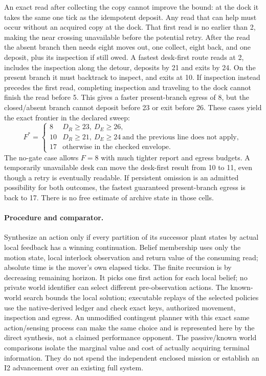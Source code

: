 \documentclass{article}
\begin{document}
An exact read after collecting the copy cannot improve the bound:
at the dock it takes the same one tick as the idempotent deposit.
Any read that can help must occur without an acquired copy at the
dock. That first read is no earlier than 2, making the near crossing
unavailable before the potential retry. After the read the absent
branch then needs eight moves out, one collect, eight back, and one
deposit, plus its inspection if still owed. A fastest desk-first
route reads at 2, includes the inspection along the detour, deposits
by 21 and exits by 24. On the present branch it must backtrack to
inspect, and exits at 10. If inspection instead precedes the first
read, completing inspection and traveling to the dock cannot finish
the read before 5. This gives a faster present-branch egress of 8,
but the closed/absent branch cannot deposit before 23 or exit before
26. These cases yield the exact frontier in the declared sweep:
\[
F^*=\begin{cases}
8 & D_R\ge 23,\ D_E\ge 26,\\
10 & D_R\ge 21,\ D_E\ge 24\ \text{and the previous line does not apply},\\
17 & \text{otherwise in the checked envelope.}
\end{cases}
\]
The no-gate case allows $F=8$ with much tighter report and egress
budgets. A temporarily unavailable desk can move the desk-first result
from 10 to 11, even though a retry is eventually readable. If
persistent omission is an admitted possibility for both outcomes,
the fastest guaranteed present-branch egress is back to 17. There
is no free estimate of archive state in those cells.

\paragraph{Procedure and comparator.}
Synthesize an action only if every partition of its successor plant
states by actual local feedback has a winning continuation. Belief
membership uses only the motion state, local interlock observation and
return value of the consuming read; absolute time is the mover's
own elapsed ticks. The finite recursion is by decreasing remaining
horizon. It picks one first action for each local belief; no private
world identifier can select different pre-observation actions. The
known-world search bounds the local solution; executable replays of
the selected policies use the native-derived ledger and check exact
keys, authorized movement, inspection and egress. An unmodified
contingent planner with this exact same action/sensing process can
make the same choice and is represented here by the direct
synthesis, not a claimed performance opponent. The passive/known
world comparisons isolate the marginal value and cost of actually
acquiring terminal information. They do not spend the independent
enclosed mission or establish an I2 advancement over an existing
full system.
\end{document}
